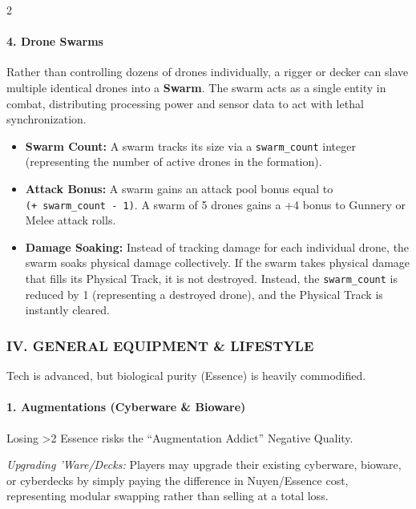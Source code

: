 \documentclass[
  oneside]{article}
\providecommand{\tightlist}{%
  \setlength{\itemsep}{0pt}\setlength{\parskip}{0pt}}
\begin{document}
\begin{multicols}{2}

\hypertarget{drone-swarms}{%
\paragraph{4. Drone Swarms}\label{drone-swarms}}

Rather than controlling dozens of drones
individually, a rigger or decker can slave
multiple identical drones into a \textbf{Swarm}.
The swarm acts as a single entity in combat,
distributing processing power and sensor data to
act with lethal synchronization.

\begin{itemize}
\tightlist
\item
  \textbf{Swarm Count:} A swarm tracks its size
  via a \texttt{swarm\_count} integer
  (representing the number of active drones in the
  formation).
\item
  \textbf{Attack Bonus:} A swarm gains an attack
  pool bonus equal to
  \texttt{(+\ swarm\_count\ -\ 1)}. A swarm of 5
  drones gains a +4 bonus to Gunnery or Melee
  attack rolls.
\item
  \textbf{Damage Soaking:} Instead of tracking
  damage for each individual drone, the swarm
  soaks physical damage collectively. If the swarm
  takes physical damage that fills its Physical
  Track, it is not destroyed. Instead, the
  \texttt{swarm\_count} is reduced by 1
  (representing a destroyed drone), and the
  Physical Track is instantly cleared.
\end{itemize}

\hypertarget{iv.-general-equipment-lifestyle}{%
\subsubsection{IV. GENERAL EQUIPMENT \&
LIFESTYLE}\label{iv.-general-equipment-lifestyle}}

Tech is advanced, but biological purity (Essence)
is heavily commodified.

\hypertarget{augmentations-cyberware-bioware}{%
\paragraph{1. Augmentations (Cyberware \&
Bioware)}\label{augmentations-cyberware-bioware}}

Losing \textgreater2 Essence risks the
``Augmentation Addict'' Negative Quality.

\emph{Upgrading 'Ware/Decks:} Players may upgrade
their existing cyberware, bioware, or cyberdecks
by simply paying the difference in Nuyen/Essence
cost, representing modular swapping rather than
selling at a total loss.

\end{multicols}
\end{document}
